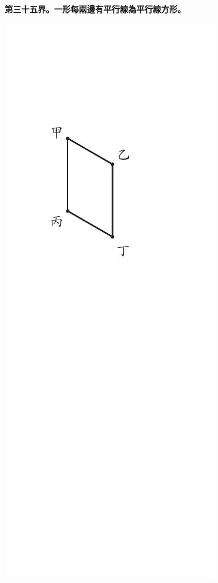 \documentclass[12pt,b5paper,landscape]{article}
\newcommand{\cthm}[1]{{
\vspace{8pt}

\bfseries #1}}
\begin{document}
\begin{multicols}{2}
\cthm{第三十五界。一形每兩邊有平行線為平行線方形。}
\begin{center}
\includegraphics[angle=90]{eu22}
\end{center}


\end{multicols}
\end{document}
